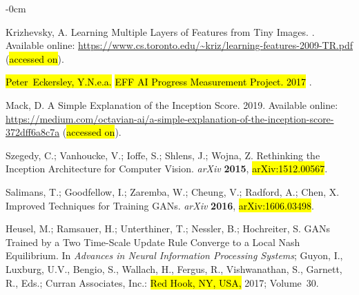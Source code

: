 \documentclass[technologies,article,accept,pdftex,moreauthors]{Definitions/mdpi}
\begin{document}
\begin{adjustwidth}{-\extralength}{0cm}
\begin{thebibliography}{999}
Krizhevsky, A.
\newblock Learning Multiple Layers of Features from Tiny Images.
. Available online: \url{https://www.cs.toronto.edu/~kriz/learning-features-2009-TR.pdf} (\hl{accessed on}).

\hl{Peter~Eckersley, Y.N.e.a.} %
\newblock \hl{EFF AI Progress Measurement Project. 2017}%
.

Mack, D. A Simple Explanation of the Inception Score. 2019. Available online: \url{https://medium.com/octavian-ai/a-simple-explanation-of-the-inception-score-372dff6a8c7a} (\hl{accessed on}).

Szegedy, C.; Vanhoucke, V.; Ioffe, S.; Shlens, J.; Wojna, Z.
\newblock Rethinking the Inception Architecture for Computer Vision.   \emph{arXiv} \textbf{2015},  \hl{arXiv:1512.00567}. 

Salimans, T.; Goodfellow, I.; Zaremba, W.; Cheung, V.; Radford, A.; Chen, X.
\newblock Improved Techniques for Training GANs. \emph{arXiv} \textbf{2016},  \hl{arXiv:1606.03498}. 

Heusel, M.; Ramsauer, H.; Unterthiner, T.; Nessler, B.; Hochreiter, S.
\newblock GANs Trained by a Two Time-Scale Update Rule Converge to a Local Nash
  Equilibrium. In \emph{Advances in Neural Information Processing
  Systems}; Guyon, I., Luxburg, U.V., Bengio, S., Wallach, H., Fergus, R.,
  Vishwanathan, S., Garnett, R., Eds.; Curran Associates, Inc.: \hl{Red Hook, NY, USA,} 2017; Volume~30.%


\end{thebibliography}
\end{adjustwidth}
\end{document}

